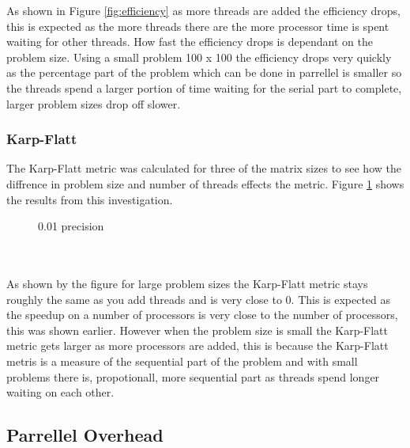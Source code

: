 \documentclass{article}
\begin{document}
As shown in Figure \ref{fig:efficiency} as more threads are added the efficiency
drops, this is expected as the more threads there are the more processor time is
spent waiting for other threads. How fast the efficiency drops is dependant on
the problem size. Using a small problem 100 x 100 the efficiency drops very quickly
as the percentage part of the problem which can be done in parrellel is smaller
so the threads spend a larger portion of time waiting for the serial part to complete, larger
problem sizes drop off slower.

\subsubsection{Karp-Flatt}

The Karp-Flatt metric was calculated for three of the matrix sizes to see how the
diffrence in problem size and number of threads effects the metric. Figure \ref{fig:karpflatt}
shows the results from this investigation.

\begin{figure}[H]
 \centering
 \caption{0.01 precision}
 \label{fig:karpflatt}
\end{figure}\\~\\

As shown by the figure for large problem sizes the Karp-Flatt metric stays roughly
the same as you add threads and is very close to 0. This is expected as the speedup on
a number of processors is very close to the number of processors, this was shown
earlier. However when the problem size is small the Karp-Flatt metric gets larger
as more processors are added, this is because the Karp-Flatt metris is a measure of
the sequential part of the problem and with small problems there is, propotionall,
more sequential part as threads spend longer waiting on each other.

\subsection{Parrellel Overhead}
\end{document}
